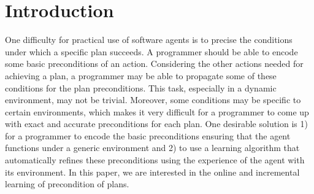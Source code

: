 \documentclass{article}
\begin{document}
 


\begin{abstract} 
\end{abstract} 

\section{Introduction}

One difficulty for practical use of software agents is to precise the
conditions under which a specific plan succeeds. A programmer should
be able to encode some basic preconditions of an action. Considering
the other actions needed for achieving a plan, a programmer may be
able to propagate some of these conditions for the plan preconditions.
This task, especially in a dynamic environment, may not be
trivial. Moreover, some conditions may be specific to certain
environments, which makes it very difficult for a programmer to come
up with exact and accurate preconditions for each plan.  One desirable
solution is 1) for a programmer to encode the basic preconditions
ensuring that the agent functions under a generic environment and 2)
to use a learning algorithm that automatically refines these
preconditions using the experience of the agent with its
environment. In this paper, we are interested in the online and
incremental learning of precondition of plans.
\end{document}
